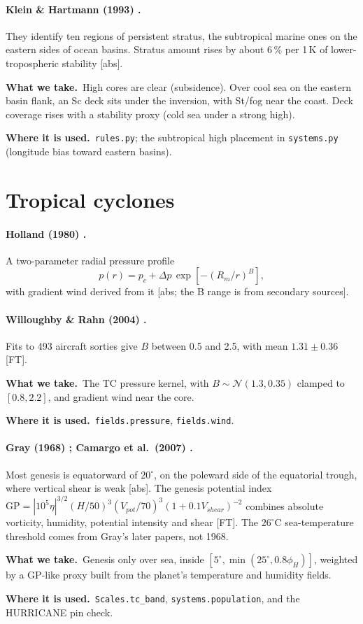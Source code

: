 \documentclass[11pt,a4paper]{article}
\newcommand{\verif}[1]{\textsf{\small[#1]}}
\newcommand{\takes}{\par\noindent\textbf{What we take.}\ }
\newcommand{\used}{\par\noindent\textbf{Where it is used.}\ }
\begin{document}
\paragraph{Klein \& Hartmann (1993) \cite{klein1993}.}
They identify ten regions of persistent stratus, the subtropical marine ones on the eastern
sides of ocean basins. Stratus amount rises by about 6\,\% per 1\,K of lower-tropospheric
stability \verif{abs}.
\takes High cores are clear (subsidence). Over cool sea on the eastern basin flank, an Sc
deck sits under the inversion, with St/fog near the coast. Deck coverage rises with a
stability proxy (cold sea under a strong high).
\used \texttt{rules.py}; the subtropical high placement in \texttt{systems.py}
(longitude bias toward eastern basins).

\section{Tropical cyclones}

\paragraph{Holland (1980) \cite{holland1980}.}
A two-parameter radial pressure profile
\begin{equation}
  p(r) = p_c + \Delta p\,\exp\!\left[-\left(R_m/r\right)^B\right],
\end{equation}
with gradient wind derived from it \verif{abs; the B range is from secondary sources}.
\paragraph{Willoughby \& Rahn (2004) \cite{willoughby2004}.}
Fits to 493 aircraft sorties give $B$ between 0.5 and 2.5, with mean
$1.31\pm0.36$ \verif{FT}.
\takes The TC pressure kernel, with $B\sim\mathcal{N}(1.3,0.35)$ clamped to $[0.8,2.2]$,
and gradient wind near the core.
\used \texttt{fields.pressure}, \texttt{fields.wind}.

\paragraph{Gray (1968) \cite{gray1968}; Camargo et al.\ (2007) \cite{camargo2007}.}
Most genesis is equatorward of $20^\circ$, on the poleward side of the equatorial trough,
where vertical shear is weak \verif{abs}. The genesis potential index
$\mathrm{GP}=|10^5\eta|^{3/2}(H/50)^3(V_{pot}/70)^3(1+0.1V_{shear})^{-2}$ combines
absolute vorticity, humidity, potential intensity and shear \verif{FT}. The
$26^\circ$C sea-temperature threshold comes from Gray's later papers, not 1968.
\takes Genesis only over sea, inside $[5^\circ, \min(25^\circ, 0.8\phi_H)]$, weighted by a
GP-like proxy built from the planet's temperature and humidity fields.
\used \texttt{Scales.tc\_band}, \texttt{systems.population}, and the HURRICANE pin check.
\end{document}

